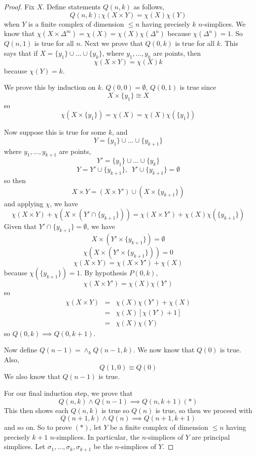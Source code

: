 \documentclass[a4paper,14pt]{extarticle}
\theoremstyle{definition}
\begin{document}
\begin{proof}
	Fix $X$. Define statements $Q(n,k)$ as follows,
	\[Q(n,k); \chi(X\times Y)=\chi(X)\chi(Y)\] when $Y$ is a finite complex of dimension 
	$\leq n$ having precisely $k$ $n$-simplices. 
	We know that $\chi(X\times\Delta^m)=\chi(X)=\chi(X)\chi(\Delta^n)$ because 
	$\chi(\Delta^n)=1$. So $Q(n,1)$ is true for all $n$. Next we prove that 
	$Q(0,k)$ is true for all $k$. This says that if $X=\{y_1\}\cup\ldots\cup \{y_k\}$, 
	where $y_1,\ldots,y_k$ are points, then 
	\[\chi(X\times Y)=\chi(X)k\] because $\chi(Y)=k$. 

	\vspace{12pt}

	We prove this by induction on $k$. $Q(0,0)=\emptyset$, $Q(0,1)$ is true since 
	\[X\times\{y_1\}\cong X\] so \[\chi(X\times\{y_1\})=\chi(X)=\chi(X)\chi(\{y_1\})\]

	\vspace{12pt}

	Now suppose this is true for some $k$, and 
	\[Y=\{y_1\}\cup\ldots\cup\{y_{k+1}\}\] where $y_1,\ldots,y_{k+1}$ are points, 
	\[Y'=\{y_1\}\cup\ldots\cup\{y_k\}\]
	\[Y=Y'\cup\{y_{k+1}\}, \,\,\,Y'\cup\{y_{k+1}\}=\emptyset\] so then 
	\[X\times Y=(X\times Y')\cup(X\times\{y_{k+1}\})\] and applying $\chi$, we have 
	\[\chi(X\times Y)+\chi(X\times(Y'\cap\{y_{k+1}\}))=\chi(X\times Y')+\chi(X)
	\chi(\{y_{k+1}\})\] Given that $Y'\cap\{y_{k+1}\}=\emptyset$, we have 
	\[X\times(Y'\times\{y_{k+1}\})=\emptyset\] \[\chi(X\times(Y'\times\{y_{k+1}\}))=0\]
	\[\chi(X\times Y)=\chi(X\times Y')+\chi(X)\] because $\chi(\{y_{k+1}\})=1$.
	By hypothesis $P(0,k)$,
	\[\chi(X\times Y')=\chi(X)\chi(Y')\] so 
	\begin{eqnarray*}
		\chi(X\times Y)&=&\chi(X)\chi(Y')+\chi(X) \\
		&=& \chi(X)[\chi(Y')+1] \\
		&=&\chi(X)\chi(Y)
	\end{eqnarray*}
	so $Q(0,k)\implies Q(0,k+1)$.

	\vspace{12pt}

	Now define $Q(n-1)=\wedge_k Q(n-1,k)$. We now know that $Q(0)$ is true. Also,
	\[Q(1,0)\equiv Q(0)\] We also know that $Q(n-1)$ is true.

	\vspace{12pt}

	For our final induction step, we prove that 
	\[Q(n,k)\wedge Q(n-1)\implies Q(n,k+1) (*)\]
	This then shows each $Q(n,k)$ is true so $Q(n)$ is true, so then we proceed with
	\[Q(n+1,k)\wedge Q(n)\implies Q(n+1,k+1)\] and so on. So to prove $(*)$, 
	let $Y$ be a finite complex of dimension $\leq n$ having precisely $k+1$ $n$-simplices.
	In particular, the $n$-simplices of $Y$ are principal simplices. Let $\sigma_1,\ldots,
	\sigma_k,\sigma_{k+1}$ be the $n$-simplices of $Y$. 


\end{proof}
\end{document}
